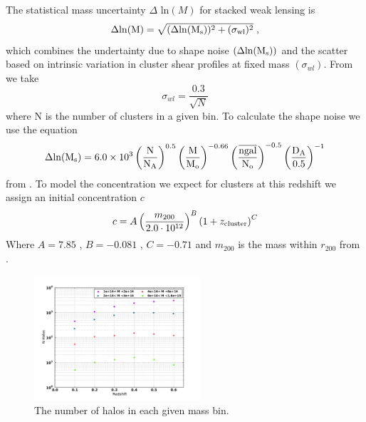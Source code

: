 The statistical mass uncertainty $\Delta$ ln$(M)$ for stacked weak lensing is \citep{obscos}
\begin{equation}
\Delta \rm{ln}(M) = \sqrt{ (\Delta  \rm{ln} (M_{s}))^2 +
(\sigma_{wl} )^2 } \; ,
\end{equation}
which combines the undertainty due to shape noise $(\Delta  \rm{ln} (M_{s}))$ and the scatter based on intrinsic variation in cluster shear profiles at fixed mass $(\sigma_{wl})$. From \citet{mbecker}
we take 
\begin{equation}
\sigma_{wl} = \frac{0.3}{\sqrt{N}}
\end{equation}
where N is the number of clusters in a given bin. To calculate the
shape noise we use the equation
\begin{equation}
\Delta \rm{ln} (M_{s}) = 6.0\times10^3
\left( \frac{N}{N_{A}} \right)^{0.5} \left( \frac{M}{M_{o}} \right)^{-0.66} \left( \frac{\overline{ngal}}{N_{o}} \right)^{-0.5}\left( \frac{D_{A}}{0.5} \right)^{-1}
\end{equation}
from \citet{obscos} . To model the concentration we expect
for clusters at this redshift we assign an initial concentration $c$
\begin{equation}
c= A \left(  m_{200} \over 2.0 \cdot 10^{12}  \right)^{B} \left( 1 + z_{\rm{cluster}} \right)^{C}
\end{equation}
Where  $ A = 7.85 $ ,  $ B = -0.081 $ , $ C= -0.71 $ and $m_{200}$ is
the mass within $r_{200}$ from \citep{oguri}. 

\begin{figure}
 \centering  %
  \includegraphics[width=0.55\textwidth]{fig/Halo_N.pdf} 
  \caption{The number of halos in each given mass bin.}
\label{fig:N_Halo}
\end{figure} 
